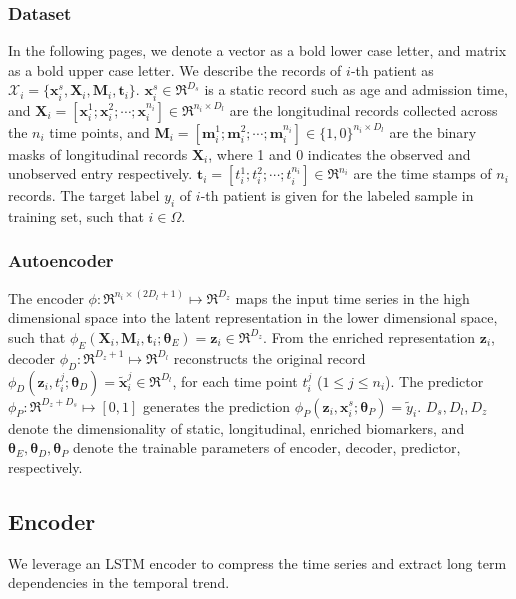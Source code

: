 \subsubsection{Dataset}
In the following pages, we denote a vector as a bold lower case letter, and matrix as a bold upper case letter. We describe the records of $i$-th patient as $\mathcal{X}_i = \{\mathbf{x}_i^s, \mathbf{X}_i, \mathbf{M}_i, \mathbf{t}_i\}$. $\mathbf{x}_i^s \in \Re^{D_s}$ is a static record such as age and admission time, and $\mathbf{X}_i = [\mathbf{x}_i^1; \mathbf{x}_i^2; \cdots; \mathbf{x}_i^{n_i}] \in \Re^{n_i \times D_l}$ are the longitudinal records collected across the $n_i$ time points, and $\mathbf{M}_i = [\mathbf{m}_i^1; \mathbf{m}_i^2; \cdots; \mathbf{m}_i^{n_i}] \in \{1, 0\}^{n_i \times D_l}$ are the binary masks of longitudinal records $\mathbf{X}_i$, where 1 and 0 indicates the observed and unobserved entry respectively. $\mathbf{t}_i = [t_i^1; t_i^2; \cdots; t_i^{n_i}] \in \Re^{n_i}$ are the time stamps of $n_i$ records. The target label $y_i$ of $i$-th patient is given for the labeled sample in training set, such that $i \in \Omega$. 

\subsubsection{Autoencoder}
The encoder $\phi: \Re^{n_i \times (2 D_l + 1)} \mapsto \Re^{D_z}$ maps the input time series in the high dimensional space into the latent representation in the lower dimensional space, such that $\phi_E(\mathbf{X}_i, \mathbf{M}_i, \mathbf{t}_i; \mathbf{\theta}_E) = \mathbf{z}_i \in \Re^{D_z}$. From the enriched representation $\mathbf{z}_i$, decoder $\phi_D: \Re^{D_z + 1} \mapsto \Re^{D_l}$ reconstructs the original record $\phi_D(\mathbf{z}_i ,t_i^j; \mathbf{\theta}_D) = \tilde{\mathbf{x}}_i^j \in \Re^{D_l}$, for each time point $t_i^j$ ($1 \leq j \leq n_i$). The predictor $\phi_P: \Re^{D_z + D_s} \mapsto [0, 1]$ generates the prediction $\phi_P(\mathbf{z}_i, \mathbf{x}_i^s; \mathbf{\theta}_P) = \tilde{y}_i$. $D_s, D_l, D_z$ denote the dimensionality of static, longitudinal, enriched biomarkers, and $\mathbf{\theta}_E, \mathbf{\theta}_D, \mathbf{\theta}_P$ denote the trainable parameters of encoder, decoder, predictor, respectively. 

\subsection{Encoder}
We leverage an LSTM encoder to compress the time series and extract long term dependencies in the temporal trend. 

